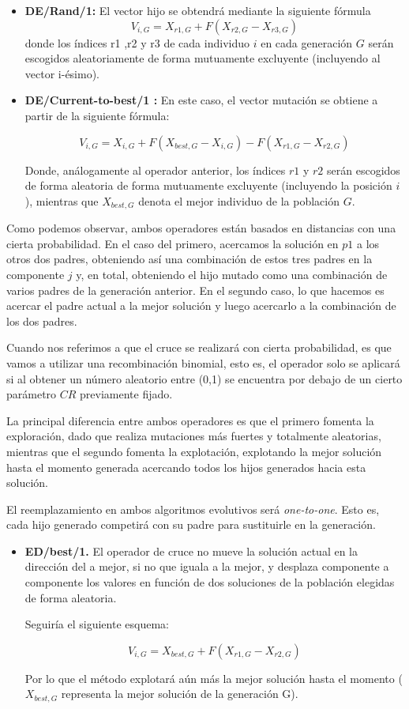 \documentclass{article}
\begin{document}
\begin{itemize}
	\item \textbf{DE/Rand/1: } El vector hijo se obtendrá mediante la siguiente fórmula
	\[
	V_{i,G} = X_{r1,G} + F (X_{r2,G} - X_{r3,G})
	\]
	donde los índices r1 ,r2 y r3 de cada individuo $i$ en cada generación $G$ serán escogidos aleatoriamente de forma mutuamente excluyente (incluyendo al vector i-ésimo).
	
	\item \textbf{DE/Current-to-best/1 :} En este caso, el vector mutación se obtiene a partir de la siguiente fórmula:
	
	\[
	V_{i,G} = X_{i,G} + F(X_{best,G} - X_{i,G}) - F(X_{r1,G} - X_{r2,G})
	\]
	
	Donde, análogamente al operador anterior, los índices $r1$ y $r2$ serán escogidos de forma aleatoria de forma mutuamente excluyente (incluyendo la posición $i$), mientras que $X_{best,G}$ denota el mejor individuo de la población $G$.
\end{itemize}

Como podemos observar, ambos operadores están basados en distancias con una cierta probabilidad. En el caso del primero, acercamos la solución en $p1$ a los otros dos padres, obteniendo así una combinación de estos tres padres en la componente $j$ y, en total, obteniendo el hijo mutado como una combinación de varios padres de la generación anterior. En el segundo caso, lo que hacemos es acercar el padre actual a la mejor solución y luego acercarlo a la combinación de los dos padres. 

Cuando nos referimos a que el cruce se realizará con cierta probabilidad, es que vamos a utilizar una recombinación binomial, esto es, el operador solo se aplicará si al obtener un número aleatorio entre (0,1) se encuentra por debajo de un cierto parámetro $CR$ previamente fijado.

La principal diferencia entre ambos operadores es que el primero fomenta la exploración, dado que realiza mutaciones más fuertes y totalmente aleatorias, mientras que el segundo fomenta la explotación, explotando la mejor solución hasta el momento generada acercando todos los hijos generados hacia esta solución.

El reemplazamiento en ambos algoritmos evolutivos será \textit{one-to-one}. Esto es, cada hijo generado competirá con su padre para sustituirle en la generación.

\begin{itemize}
	\item \textbf{ED/best/1.}  El operador de cruce no mueve la solución actual en la dirección del a mejor, si no que iguala a la mejor, y desplaza componente a componente los valores en función de dos soluciones de la población elegidas de forma aleatoria.
	
	Seguiría el siguiente esquema:
	
	\[
	V_{i,G} = X_{best,G} + F (X_{r1,G} - X_{r2,G})
	\]
	
	Por lo que el método explotará aún más la mejor solución hasta el momento ($X_{best,G}$ representa la mejor solución de la generación G).
\end{itemize}
\end{document}
